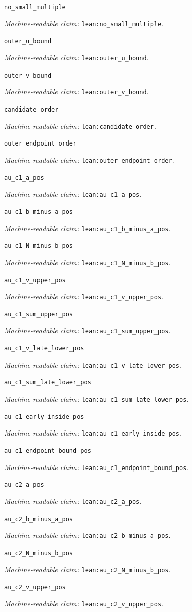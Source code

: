 \documentclass[11pt]{amsart}
\newcommand{\record}[1]{\nolinkurl{#1}}
\newcommand{\claimid}[1]{\par\nopagebreak\noindent\textit{Machine-readable claim:} \record{#1}.\par}
\begin{document}
\par\noindent\label{lean:no_small_multiple}\record{no_small_multiple}
\claimid{lean:no_small_multiple}
\par\noindent\label{lean:outer_u_bound}\record{outer_u_bound}
\claimid{lean:outer_u_bound}
\par\noindent\label{lean:outer_v_bound}\record{outer_v_bound}
\claimid{lean:outer_v_bound}
\par\noindent\label{lean:candidate_order}\record{candidate_order}
\claimid{lean:candidate_order}
\par\noindent\label{lean:outer_endpoint_order}\record{outer_endpoint_order}
\claimid{lean:outer_endpoint_order}
\par\noindent\label{lean:au_c1_a_pos}\record{au_c1_a_pos}
\claimid{lean:au_c1_a_pos}
\par\noindent\label{lean:au_c1_b_minus_a_pos}\record{au_c1_b_minus_a_pos}
\claimid{lean:au_c1_b_minus_a_pos}
\par\noindent\label{lean:au_c1_N_minus_b_pos}\record{au_c1_N_minus_b_pos}
\claimid{lean:au_c1_N_minus_b_pos}
\par\noindent\label{lean:au_c1_v_upper_pos}\record{au_c1_v_upper_pos}
\claimid{lean:au_c1_v_upper_pos}
\par\noindent\label{lean:au_c1_sum_upper_pos}\record{au_c1_sum_upper_pos}
\claimid{lean:au_c1_sum_upper_pos}
\par\noindent\label{lean:au_c1_v_late_lower_pos}\record{au_c1_v_late_lower_pos}
\claimid{lean:au_c1_v_late_lower_pos}
\par\noindent\label{lean:au_c1_sum_late_lower_pos}\record{au_c1_sum_late_lower_pos}
\claimid{lean:au_c1_sum_late_lower_pos}
\par\noindent\label{lean:au_c1_early_inside_pos}\record{au_c1_early_inside_pos}
\claimid{lean:au_c1_early_inside_pos}
\par\noindent\label{lean:au_c1_endpoint_bound_pos}\record{au_c1_endpoint_bound_pos}
\claimid{lean:au_c1_endpoint_bound_pos}
\par\noindent\label{lean:au_c2_a_pos}\record{au_c2_a_pos}
\claimid{lean:au_c2_a_pos}
\par\noindent\label{lean:au_c2_b_minus_a_pos}\record{au_c2_b_minus_a_pos}
\claimid{lean:au_c2_b_minus_a_pos}
\par\noindent\label{lean:au_c2_N_minus_b_pos}\record{au_c2_N_minus_b_pos}
\claimid{lean:au_c2_N_minus_b_pos}
\par\noindent\label{lean:au_c2_v_upper_pos}\record{au_c2_v_upper_pos}
\claimid{lean:au_c2_v_upper_pos}
\end{document}

